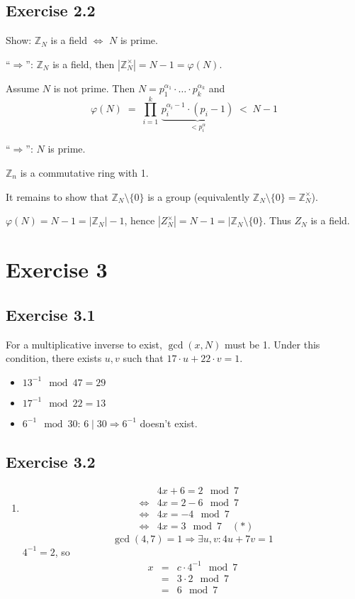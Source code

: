 \documentclass[a4paper]{scrreprt}
\newcommand\Z{\mathbb Z}
\begin{document}
\subsection*{Exercise 2.2}

Show: $\Z_N$ is a field $\Leftrightarrow$ $N$ is prime.

``$\Rightarrow$'': $\Z_N$ is a field, then $|\Z_N^\times|=N-1=\varphi(N)$.

Assume $N$ is not prime. Then $N = p_1^{\alpha_1}\cdot\hdots\cdot p_k^{\alpha_k}$ and
\[\varphi(N) \;=\; \prod_{i=1}^k\,\underbrace{p_i^{\alpha_i-1}\cdot(p_i-1)}_{<p_i^\alpha}\;<\;N-1\]

``$\Rightarrow$'': $N$ is prime.

$\Z_n$ is a commutative ring with 1.

It remains to show that $\Z_N \setminus \{0\}$ is a group (equivalently $\Z_N\setminus\{0\}=\Z_N^\times$).

$\varphi(N)= N-1 = |\Z_N|-1$, hence $|Z_N^\times|=N-1=|\Z_N\setminus\{0\}$. Thus $Z_N$ is a field.

\section*{Exercise 3}
\subsection*{Exercise 3.1}

For a multiplicative inverse to exist, $\gcd(x, N)$ must be 1. Under this condition, there exists $u,v$
such that $17\cdot u+22\cdot v=1$.

\begin{itemize}
    \item $13^{-1} \mod 47 = 29$
    \item $17^{-1} \mod 22 = 13$
    \item $6^{-1} \mod 30$: $6\mid 30\Rightarrow 6^{-1}$ doesn't exist.
\end{itemize}

\subsection*{Exercise 3.2}

\begin{enumerate}[label=\alph*)]
    \item
        \begin{eqnarray*}
            && 4x+6=2\mod 7\\
            &\Leftrightarrow& 4x = 2-6 \mod 7\\
            &\Leftrightarrow& 4x = -4\mod 7\\
            &\Leftrightarrow& 4x = 3 \mod 7\quad(*)
        \end{eqnarray*}
        \[\gcd(4,7) = 1 \Rightarrow\exists u,v:4u+7v=1\]
        $4^{-1}=2$, so
        \begin{eqnarray*}
            x&=&c\cdot 4^{-1}\mod 7\\
            &=& 3\cdot 2\mod 7\\
            &=& 6 \mod 7
        \end{eqnarray*}
\end{enumerate}
\end{document}
